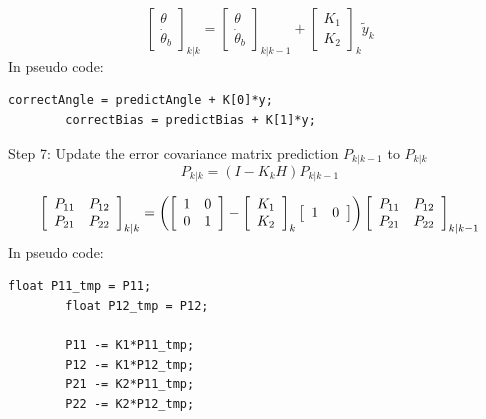 \documentclass[a4paper]{report}
\begin{document}
		\begin{equation}
		\left[
		\begin{array}{c}
		\theta\\
		\dot{\theta}_{b}
		\end{array} \right]_{k|k}
		=
		\left[
		\begin{array}{c}
		\theta\\
		\dot{\theta}_{b}
		\end{array} \right]_{k|k-1}
		+
		\left[
		\begin{array}{c}
		K_{1}\\
		K_{2}
		\end{array} \right]_{k}
		\tilde{y}_{k}
		\end{equation}
    In pseudo code:
		\begin{lstlisting}[frame=single]
		correctAngle = predictAngle + K[0]*y;
		correctBias = predictBias + K[1]*y;
		\end{lstlisting}
		Step 7: Update the error covariance matrix prediction $P_{k|k-1}$ to $P_{k|k}$
		\begin{equation}
		P_{k|k}=(I-K_{k}H)P_{k|k-1}
		\end{equation}

		\begin{equation}
		\left[
		\begin{array}{c c}
		P_{11}	&	P_{12}\\
		P_{21}	&	P_{22}
		\end{array} \right]_{k|k}
		=
		\left(
		\left[
		\begin{array}{c c}
		1	&	0\\
		0	&	1
		\end{array} \right]
		-
		\left[
		\begin{array}{c}
		K_{1}\\
		K_{2}
		\end{array} \right]_{k}
		\left[
		\begin{array}{c c}
		1	&	0
		\end{array} \right]
		\right)
		\left[
		\begin{array}{c c}
		P_{11}	&	P_{12}\\
		P_{21}	&	P_{22}
		\end{array} \right]_{k|k-1}
		\end{equation}
    In pseudo code:
		\begin{lstlisting}[frame=single]
		float P11_tmp = P11;
		float P12_tmp = P12;

		P11 -= K1*P11_tmp;
		P12 -= K1*P12_tmp;
		P21 -= K2*P11_tmp;
		P22 -= K2*P12_tmp;
		\end{lstlisting}
\end{document}
